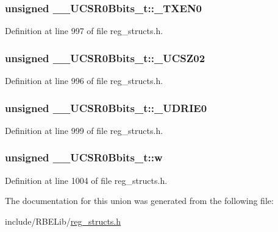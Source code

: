 \hypertarget{union_____u_c_s_r0_bbits__t_a2b29e2bd43ab54feed67248adf954847}{
\subsubsection[{\+\_\+\+T\+X\+E\+N0}]{\setlength{\rightskip}{0pt plus 5cm}unsigned \+\_\+\+\_\+\+U\+C\+S\+R0\+Bbits\+\_\+t\+::\+\_\+\+T\+X\+E\+N0}}\label{union_____u_c_s_r0_bbits__t_a2b29e2bd43ab54feed67248adf954847}


Definition at line 997 of file reg\+\_\+structs.\+h.

\hypertarget{union_____u_c_s_r0_bbits__t_a8eae807a40cd6b9e43d820b05fabf876}{
\subsubsection[{\+\_\+\+U\+C\+S\+Z02}]{\setlength{\rightskip}{0pt plus 5cm}unsigned \+\_\+\+\_\+\+U\+C\+S\+R0\+Bbits\+\_\+t\+::\+\_\+\+U\+C\+S\+Z02}}\label{union_____u_c_s_r0_bbits__t_a8eae807a40cd6b9e43d820b05fabf876}


Definition at line 996 of file reg\+\_\+structs.\+h.

\hypertarget{union_____u_c_s_r0_bbits__t_a2216a495afc28a49bea6d4a9db762f82}{
\subsubsection[{\+\_\+\+U\+D\+R\+I\+E0}]{\setlength{\rightskip}{0pt plus 5cm}unsigned \+\_\+\+\_\+\+U\+C\+S\+R0\+Bbits\+\_\+t\+::\+\_\+\+U\+D\+R\+I\+E0}}\label{union_____u_c_s_r0_bbits__t_a2216a495afc28a49bea6d4a9db762f82}


Definition at line 999 of file reg\+\_\+structs.\+h.

\hypertarget{union_____u_c_s_r0_bbits__t_a1a781c79ede013888d206fdb353b4984}{
\subsubsection[{w}]{\setlength{\rightskip}{0pt plus 5cm}unsigned \+\_\+\+\_\+\+U\+C\+S\+R0\+Bbits\+\_\+t\+::w}}\label{union_____u_c_s_r0_bbits__t_a1a781c79ede013888d206fdb353b4984}


Definition at line 1004 of file reg\+\_\+structs.\+h.



The documentation for this union was generated from the following file\+:\begin{DoxyCompactItemize}
\item 
include/\+R\+B\+E\+Lib/\hyperlink{reg__structs_8h}{reg\+\_\+structs.\+h}\end{DoxyCompactItemize}
